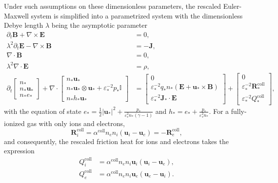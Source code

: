 \documentclass{article}
\begin{document}
Under such assumptions on these dimensionless parameters, the rescaled Euler-Maxwell system is simplified into a parametrized system with the dimensionless Debye length $\lambda$ being the asymptotic parameter
\begin{align}
    \partial_t \mathbf{B} + \nabla \times \mathbf{E} &= 0, \label{equ:maxwell_faraday_rescaled} \\ 
    \lambda^2 \partial_t \mathbf{E} - \nabla \times \mathbf{B} &= - \mathbf{J}, \label{equ:maxwell_ampere_rescaled} \\
    \nabla \cdot \mathbf{B} &= 0,  \label{equ:maxwell_gauss_B_rescaled}\\
    \lambda^2 \nabla \cdot \mathbf{E} &= \rho, \label{equ:maxwell_gauss_D_rescaled} \\
    \partial_t
    \begin{bmatrix}
    n_* \\
    n_* \mathbf{u}_* \\
    n_* e_*
    \end{bmatrix}
    + \nabla \cdot
    \begin{bmatrix}
    n_* \mathbf{u}_* \\
    n_* \mathbf{u}_* \otimes \mathbf{u}_* + \varepsilon_*^{-2} p_*\mathbb{I} \\
    n_* h_* \mathbf{u}_*
    \end{bmatrix}
    &=
    \begin{bmatrix}
    0 \\
    \varepsilon_*^{-2} q_* n_* (\mathbf{E} + \mathbf{u}_* \times \mathbf{B}) \\
    \varepsilon_*^{-2} \mathbf{J}_* \cdot \mathbf{E}
    \end{bmatrix}+
    \begin{bmatrix}
    0 \\
    \varepsilon_*^{-2}\mathbf{R}_*^{\text{coll}} \\
    \varepsilon_*^{-2}Q_*^{\text{coll}} 
    \end{bmatrix}, \label{equ:euler_rescaled}
\end{align}
with the equation of state $e_* = \frac{1}{2}|\mathbf{u_*}|^2 + \frac{p_*}{\varepsilon^2_* n_* (\gamma - 1)}$ and $h_* = e_* + \frac{p_*}{\varepsilon^2_* n_*}$. For a fully-ionized gas with only ions and electrons, 
\begin{equation} \label{equ:collision_rescaled} 
    \mathbf{R}_i^{\text{coll}} = \alpha^{\text{coll}}n_en_i(\mathbf{u}_i - \mathbf{u}_e) = - \mathbf{R}_e^{\text{coll}},
\end{equation}
and consequently, the rescaled friction heat for ions and electrons takes the expression
\begin{align*} 
    Q_i^{\text{coll}} &= \alpha^{\text{coll}}n_en_i \mathbf{u}_i (\mathbf{u}_i - \mathbf{u}_e), \\
    Q_e^{\text{coll}} &= \alpha^{\text{coll}}n_en_i \mathbf{u}_e (\mathbf{u}_e - \mathbf{u}_i).
\end{align*}
\end{document}
